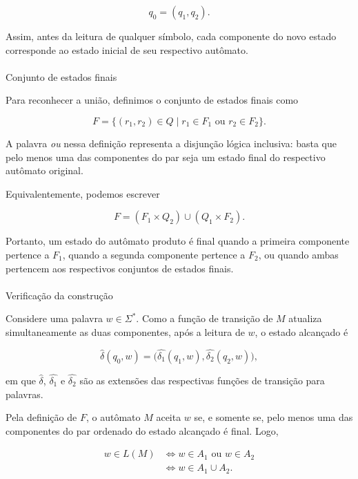 \documentclass[
  brazilian,
  letterpaper,
]{book}
\makeatletter
\let\oldparagraph\paragraph
\renewcommand{\paragraph}{
    \@ifstar
      \xxxParagraphStar
      \xxxParagraphNoStar
  }
\newcommand{\xxxParagraphStar}[1]{\oldparagraph*{#1}\mbox{}}
\newcommand{\xxxParagraphNoStar}[1]{\oldparagraph{#1}\mbox{}}
\theoremstyle{plain}
\theoremstyle{definition}
\theoremstyle{remark}
\makeatother
\begin{document}
\[
q_0 = (q_1,q_2).
\]

Assim, antes da leitura de qualquer símbolo, cada componente do novo
estado corresponde ao estado inicial de seu respectivo autômato.

\paragraph{Conjunto de estados finais}\label{conjunto-de-estados-finais}

Para reconhecer a união, definimos o conjunto de estados finais como

\[
F =
\{(r_1,r_2) \in Q
\mid r_1 \in F_1 \text{ ou } r_2 \in F_2\}.
\]

A palavra \emph{ou} nessa definição representa a disjunção lógica
inclusiva: basta que pelo menos uma das componentes do par seja um
estado final do respectivo autômato original.

Equivalentemente, podemos escrever

\[
F = (F_1 \times Q_2) \cup (Q_1 \times F_2).
\]

Portanto, um estado do autômato produto é final quando a primeira
componente pertence a \(F_1\), quando a segunda componente pertence a
\(F_2\), ou quando ambas pertencem aos respectivos conjuntos de estados
finais.

\paragraph{Verificação da
construção}\label{verificauxe7uxe3o-da-construuxe7uxe3o}

Considere uma palavra \(w \in \Sigma^*\). Como a função de transição de
\(M\) atualiza simultaneamente as duas componentes, após a leitura de
\(w\), o estado alcançado é

\[
\hat{\delta}(q_0,w)
=
\bigl(\hat{\delta_1}(q_1,w),\hat{\delta_2}(q_2,w)\bigr),
\]

em que \(\hat{\delta}\), \(\hat{\delta_1}\) e \(\hat{\delta_2}\) são as
extensões das respectivas funções de transição para palavras.

Pela definição de \(F\), o autômato \(M\) aceita \(w\) se, e somente se,
pelo menos uma das componentes do par ordenado do estado alcançado é
final. Logo,

\[
\begin{aligned}
w \in L(M)
&\iff w \in A_1 \text{ ou } w \in A_2\\
&\iff w \in A_1 \cup A_2.
\end{aligned}
\]
\end{document}
